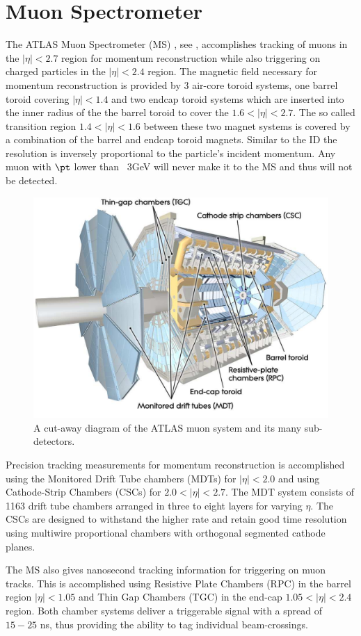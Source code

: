 \section{Muon Spectrometer} \label{sec:atlas:muons}

The ATLAS Muon Spectrometer (MS) \cite{PERF-2007-01}, see
, accomplishes tracking of muons in the $|\eta|
< 2.7$ region for momentum reconstruction while also triggering on
charged particles in the $|\eta| < 2.4$ region.  The magnetic field necessary
for momentum reconstruction is provided by 3 air-core toroid systems, one
barrel toroid covering $|\eta| < 1.4$ and two endcap toroid systems which are
inserted into the inner radius of the the barrel toroid to cover the $1.6 <
|\eta| < 2.7$. The so called transition region $1.4 < |\eta| < 1.6$ between
these two magnet systems is covered by a combination of the barrel and endcap
toroid magnets.  Similar to the ID the resolution is inversely proportional to
the particle's incident momentum.  Any muon with $\pt$ lower than ~3GeV will never
make it to the MS and thus will not be detected.  

\begin{figure}[!htbp]
  \begin{center}
    \includegraphics[width=0.8\linewidth]{figures/atlas/muon_system}
    \caption{ \cite{PERF-2007-01} A cut-away diagram of the ATLAS muon system
and its many sub-detectors.}
    \label{fig:muon_system}
  \end{center}
\end{figure}

Precision tracking measurements for momentum reconstruction is accomplished
using the Monitored Drift Tube chambers (MDTs) for $|\eta| < 2.0$ and using
Cathode-Strip Chambers (CSCs) for $2.0 < |\eta| < 2.7$.  The MDT system consists of
1163 drift tube chambers arranged in three to eight layers for varying $\eta$.
The CSCs are designed to withstand the higher rate and retain good time
resolution using multiwire proportional chambers with orthogonal segmented
cathode planes.

The MS also gives nanosecond tracking information for triggering on muon tracks.
This is accomplished using Resistive Plate Chambers (RPC) in the barrel region
$|\eta| < 1.05$ and Thin Gap Chambers (TGC) in the end-cap $1.05 < |\eta| < 2.4$
region.  Both chamber systems deliver a triggerable signal with a spread of
$15-25$ ns, thus providing the ability to tag individual beam-crossings.
